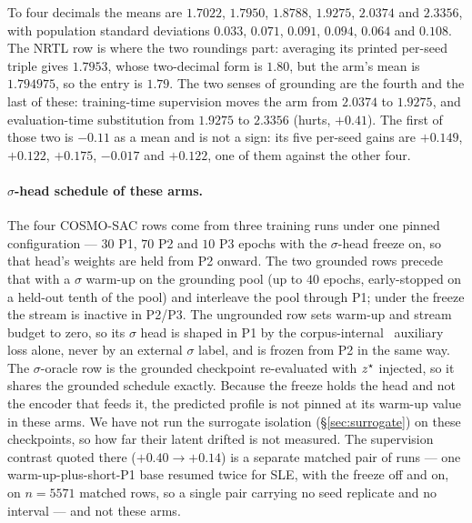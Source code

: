 \noindent To four decimals the means are $1.7022$, $1.7950$, $1.8788$, $1.9275$, $2.0374$ and
$2.3356$, with population standard deviations $0.033$, $0.071$, $0.091$, $0.094$, $0.064$ and
$0.108$. The NRTL row is where the two roundings part: averaging its printed per-seed triple gives
$1.7953$, whose two-decimal form is $1.80$, but the arm's mean is $1.794975$, so the entry is
$1.79$. The two senses
of grounding are the fourth and the last of these: training-time supervision moves the arm from
$2.0374$ to $1.9275$, and evaluation-time substitution from $1.9275$ to $2.3356$ (hurts,
$+0.41$). The first of those two is $-0.11$ as a mean and is not a sign: its five per-seed gains are
$+0.149$, $+0.122$, $+0.175$, $-0.017$ and $+0.122$, one of them against the other four.

\paragraph{$\sigma$-head schedule of these arms.} The four COSMO-SAC rows come from three
training runs under one pinned configuration --- $30$ P1, $70$ P2 and $10$ P3 epochs with
the $\sigma$-head freeze on, so that head's weights are held from P2
onward. The two grounded rows precede that with a $\sigma$ warm-up on the grounding pool (up to $40$
epochs, early-stopped on a held-out tenth of the pool) and interleave the pool through P1; under the
freeze the stream is inactive in P2/P3. The ungrounded row sets warm-up and stream budget to zero,
so its $\sigma$ head is shaped in P1 by the corpus-internal \lngi\ auxiliary loss alone, never by an
external $\sigma$ label, and is frozen from P2 in the same way. The $\sigma$-oracle row is the grounded
checkpoint re-evaluated with $z^\star$ injected, so it shares the grounded schedule exactly. Because
the freeze holds the head and not the encoder that feeds it, the predicted profile is not pinned at
its warm-up value in these arms. We have not run the surrogate isolation (\S\ref{sec:surrogate}) on
these checkpoints, so how far their latent drifted is not measured. The supervision contrast
quoted there ($+0.40\to+0.14$) is a separate matched pair of runs --- one warm-up-plus-short-P1 base
resumed twice for SLE, with the freeze off and on, on $n{=}5571$ matched rows, so a single pair
carrying no seed replicate and no interval --- and not these arms.

